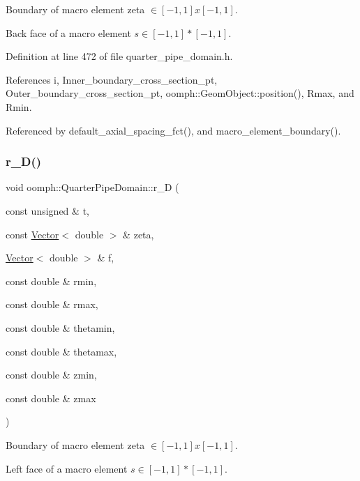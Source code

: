 Boundary of macro element zeta $ \in [-1,1]x[-1,1] $. 

Back face of a macro element $ s \in [-1,1]*[-1,1] $. 

Definition at line 472 of file quarter\+\_\+pipe\+\_\+domain.\+h.



References i, Inner\+\_\+boundary\+\_\+cross\+\_\+section\+\_\+pt, Outer\+\_\+boundary\+\_\+cross\+\_\+section\+\_\+pt, oomph\+::\+Geom\+Object\+::position(), Rmax, and Rmin.



Referenced by default\+\_\+axial\+\_\+spacing\+\_\+fct(), and macro\+\_\+element\+\_\+boundary().

\mbox{\label{classoomph_1_1QuarterPipeDomain_aeb6e4d3fbb8afb4ad2597601f1a46afd}} 
\subsubsection{\texorpdfstring{r\+\_\+\+D()}{r\_D()}}
{\footnotesize\ttfamily void oomph\+::\+Quarter\+Pipe\+Domain\+::r\+\_\+D (\begin{DoxyParamCaption}\item[{const unsigned \&}]{t,  }\item[{const \hyperlink{classoomph_1_1Vector}{Vector}$<$ double $>$ \&}]{zeta,  }\item[{\hyperlink{classoomph_1_1Vector}{Vector}$<$ double $>$ \&}]{f,  }\item[{const double \&}]{rmin,  }\item[{const double \&}]{rmax,  }\item[{const double \&}]{thetamin,  }\item[{const double \&}]{thetamax,  }\item[{const double \&}]{zmin,  }\item[{const double \&}]{zmax }\end{DoxyParamCaption})\hspace{0.3cm}{\ttfamily [private]}}



Boundary of macro element zeta $ \in [-1,1]x[-1,1] $. 

Left face of a macro element $s \in [-1,1]*[-1,1] $. 


